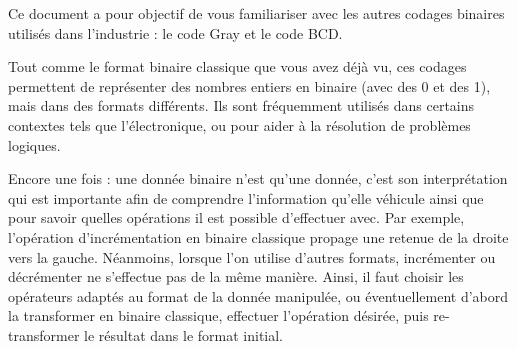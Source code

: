 \documentclass[11pt,a4paper]{article}
\begin{document}
\EncadreTitre

\bigskip


%
%

\bigskip


Ce document a pour objectif de vous familiariser avec les autres codages binaires utilisés dans l'industrie : le code Gray et le code BCD.

\bigskip

Tout comme le format binaire classique que vous avez déjà vu, ces codages permettent de représenter des nombres entiers en binaire (avec des 0 et des 1), mais dans des formats différents.
Ils sont fréquemment utilisés dans certains contextes tels que l'électronique, ou pour aider à la résolution de problèmes logiques.

\bigskip

Encore une fois : une donnée binaire n'est qu'une donnée, c'est son interprétation qui est importante afin de comprendre l'information qu'elle véhicule ainsi que pour savoir quelles opérations il est possible d'effectuer avec.
Par exemple, l'opération d'incrémentation en binaire classique propage une retenue de la droite vers la gauche.
Néanmoins, lorsque l'on utilise d'autres formats, incrémenter ou décrémenter ne s'effectue pas de la même manière.
Ainsi, il faut choisir les opérateurs adaptés au format de la donnée manipulée, ou éventuellement d'abord la transformer en binaire classique, effectuer l'opération désirée, puis re-transformer le résultat dans le format initial.


\vfillFirst

\vfillLast

\end{document}
